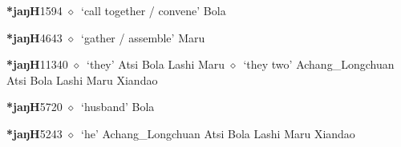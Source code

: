   \begin{list}{}{\leftmargin=1.5em \itemindent=-1.5em}
  \item {\footnotesize \textbf{*jaŋH}}{\tiny 1594}
         $\diamond$~`call together / convene'
         Bola 
  \item {\footnotesize \textbf{*jaŋH}}{\tiny 4643}
\hspace{1ex}
         $\diamond$~`gather / assemble'
         Maru 
  \item {\footnotesize \textbf{*jaŋH}}{\tiny 11340}
\hspace{1ex}
         $\diamond$~`they'
         Atsi 
\hspace{1ex}
         Bola 
\hspace{1ex}
         Lashi 
\hspace{1ex}
         Maru 
\hspace{1ex}
         $\diamond$~`they two'
         Achang\_Longchuan 
\hspace{1ex}
         Atsi 
\hspace{1ex}
         Bola 
\hspace{1ex}
         Lashi 
\hspace{1ex}
         Maru 
\hspace{1ex}
         Xiandao 
  \item {\footnotesize \textbf{*jaŋH}}{\tiny 5720}
\hspace{1ex}
         $\diamond$~`husband'
         Bola 
  \item {\footnotesize \textbf{*jaŋH}}{\tiny 5243}
\hspace{1ex}
         $\diamond$~`he'
         Achang\_Longchuan 
\hspace{1ex}
         Atsi 
\hspace{1ex}
         Bola 
\hspace{1ex}
         Lashi 
\hspace{1ex}
         Maru 
\hspace{1ex}
         Xiandao 
  \end{list}

